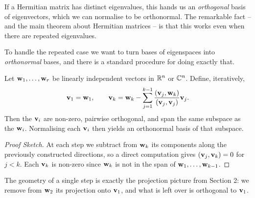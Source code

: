 \documentclass[a4paper]{scrartcl}
\begin{document}
If a Hermitian matrix has distinct eigenvalues, this hands us an \emph{orthogonal} basis of eigenvectors, which we can normalise to be orthonormal. The remarkable fact -- and the main theorem about Hermitian matrices -- is that this works even when there are repeated eigenvalues.

To handle the repeated case we want to turn bases of eigenspaces into \emph{orthonormal} bases, and there is a standard procedure for doing exactly that.

\begin{proposition}
	Let $\mathbf{w}_1, \dots, \mathbf{w}_r$ be linearly independent vectors in $\mathbb{R}^n$ or $\mathbb{C}^n$. Define, iteratively,
	$$
	\mathbf{v}_1 = \mathbf{w}_1, \quad\quad \mathbf{v}_{k} = \mathbf{w}_{k} - \sum_{j = 1}^{k - 1}\frac{(\mathbf{v}_j, \mathbf{w}_{k})}{(\mathbf{v}_j, \mathbf{v}_j)}\mathbf{v}_j.
	$$
	Then the $\mathbf{v}_i$ are non-zero, pairwise orthogonal, and span the same subspace as the $\mathbf{w}_i$. Normalising each $\mathbf{v}_i$ then yields an orthonormal basis of that subspace.
\end{proposition}
\begin{proof}[Proof Sketch]
	At each step we subtract from $\mathbf{w}_k$ its components along the previously constructed directions, so a direct computation gives $(\mathbf{v}_j, \mathbf{v}_k) = 0$ for $j < k$. Each $\mathbf{v}_k$ is non-zero since $\mathbf{w}_k$ is not in the span of $\mathbf{w}_1, \dots, \mathbf{w}_{k-1}$.
\end{proof}

The geometry of a single step is exactly the projection picture from Section 2: we remove from $\mathbf{w}_2$ its projection onto $\mathbf{v}_1$, and what is left over is orthogonal to $\mathbf{v}_1$.

\begin{center}
\end{center}
\end{document}
